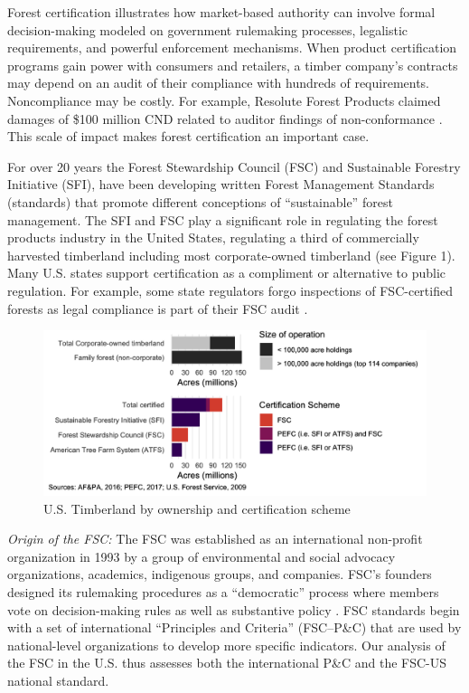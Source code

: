 \documentclass[
      12pt,
            Review ]{article}
\begin{document}
Forest certification illustrates how market-based authority can involve
formal decision-making modeled on government rulemaking processes,
legalistic requirements, and powerful enforcement mechanisms. When
product certification programs gain power with consumers and retailers,
a timber company's contracts may depend on an audit of their compliance
with hundreds of requirements. Noncompliance may be costly. For example,
Resolute Forest Products claimed damages of \$100 million CND related to
auditor findings of non-conformance \citep{Tigar2017}. This scale of
impact makes forest certification an important case.

For over 20 years the Forest Stewardship Council (FSC) and Sustainable
Forestry Initiative (SFI), have been developing written Forest
Management Standards (standards) that promote different conceptions of
``sustainable'' forest management. The SFI and FSC play a significant
role in regulating the forest products industry in the United States,
regulating a third of commercially harvested timberland including most
corporate-owned timberland (see Figure 1). Many U.S. states support
certification as a compliment or alternative to public regulation. For
example, some state regulators forgo inspections of FSC-certified
forests as legal compliance is part of their FSC audit
\citep{Judge-Lord2013}.

\begin{figure}
\centering
\includegraphics{Figs/acres-1.png}
\caption{U.S. Timberland by ownership and certification scheme}
\end{figure}

\emph{Origin of the FSC:} The FSC was established as an international
non-profit organization in 1993 by a group of environmental and social
advocacy organizations, academics, indigenous groups, and companies.
FSC's founders designed its rulemaking procedures as a ``democratic''
process where members vote on decision-making rules as well as
substantive policy \citep{Meidinger2003}. FSC standards begin with a set
of international ``Principles and Criteria'' (FSC--P\&C) that are used
by national-level organizations to develop more specific indicators. Our
analysis of the FSC in the U.S. thus assesses both the international
P\&C and the FSC-US national standard.
\end{document}
